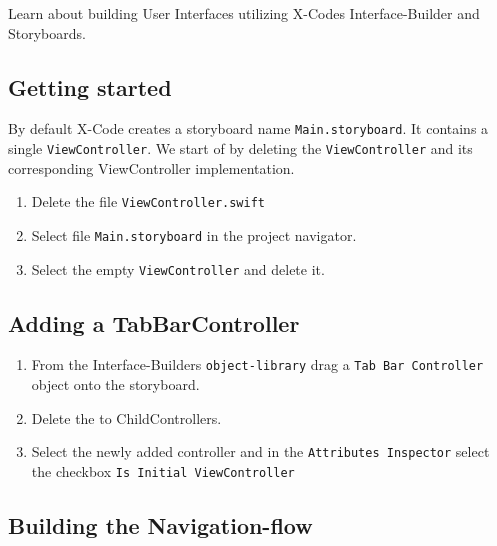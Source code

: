 \documentclass{article}
\begin{document}
Learn about building User Interfaces utilizing X-Codes Interface-Builder
and Storyboards.

\subsection{Getting started}\label{step4:getting-started}
By default X-Code creates a storyboard name \texttt{Main.storyboard}.
It contains a single \texttt{ViewController}.
We start of by deleting the \texttt{ViewController} and its
corresponding ViewController implementation.

\begin{enumerate}
\def\labelenumi{\arabic{enumi}.}

\item
  Delete the file \texttt{ViewController.swift}
\item
  Select file \texttt{Main.storyboard} in the project navigator.
\item
  Select the empty \texttt{ViewController} and delete it.
\end{enumerate}

\subsection{Adding a TabBarController}\label{adding-a-tabbarcontroller}

\begin{enumerate}
\item
  From the Interface-Builders \texttt{object-library} drag a
  \texttt{Tab\ Bar\ Controller} object onto the storyboard.
\item
  Delete the to ChildControllers.
\item
  Select the newly added controller and in the
  \texttt{Attributes\ Inspector} select the checkbox
  \texttt{Is\ Initial\ ViewController}
\end{enumerate}

\subsection{Building the Navigation-flow}\label{building-the-navigation-flow}
\end{document}
